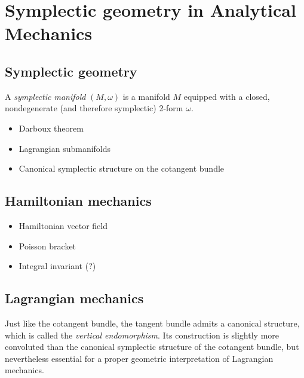 \chapter{Symplectic geometry in Analytical Mechanics}
\label{app:symplectic_geometry}

\section{Symplectic geometry}
A \emph{symplectic manifold} $(M, \omega)$ is a manifold $M$ equipped with a closed, nondegenerate (and therefore symplectic) 2-form $\omega$.
 
\begin{itemize}
    \item Darboux theorem
    \item Lagrangian submanifolds
    \item Canonical symplectic structure on the cotangent bundle
\end{itemize}

\section{Hamiltonian mechanics}

\begin{itemize}
    \item Hamiltonian vector field
    \item Poisson bracket
    \item Integral invariant (?)
\end{itemize}

\section{Lagrangian mechanics}
Just like the cotangent bundle, the tangent bundle admits a canonical structure, which is called the \emph{vertical endomorphism}. Its construction is slightly more convoluted than the canonical symplectic structure of the cotangent bundle, but nevertheless essential for a proper geometric interpretation of Lagrangian mechanics. 

